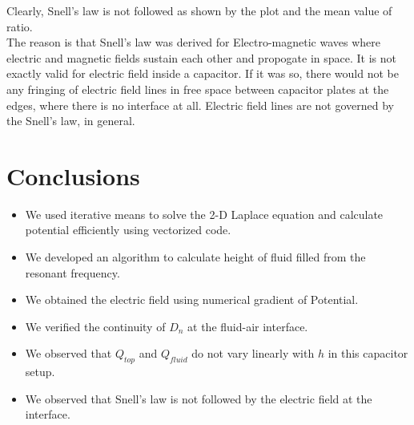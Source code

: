 \documentclass[11pt, a4paper]{article}
\begin{document}
Clearly, Snell's law is not followed as shown by the plot and the mean value of ratio.
\\
The reason is that Snell's law was derived for Electro-magnetic waves where electric and magnetic fields sustain each other and propogate in space.
It is not exactly valid for electric field inside a capacitor. If it was so, there would not be any fringing of electric field lines in free space between capacitor plates at the edges,
where there is no interface at all. Electric field lines are not governed by the Snell's law, in general.

\section{Conclusions}
\begin{itemize}
\item We used iterative means to solve the 2-D Laplace equation and calculate potential efficiently using vectorized code.
\item We developed an algorithm to calculate height of fluid filled from the resonant frequency.
\item We obtained the electric field using numerical gradient of Potential.
\item We verified the continuity of $D_n$ at the fluid-air interface.
\item We observed that $Q_{top}$ and $Q_{fluid}$ do not vary linearly with $h$ in this capacitor setup.
\item We observed that Snell's law is not followed by the electric field at the interface.
\end{itemize}
\end{document}
